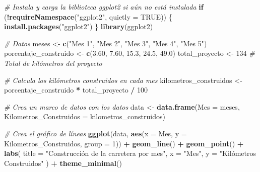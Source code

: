 \documentclass[
]{article}
\newenvironment{Shaded}{\begin{snugshade}}{\end{snugshade}}
\newcommand{\AttributeTok}[1]{\textcolor[rgb]{0.13,0.29,0.53}{#1}}
\newcommand{\CommentTok}[1]{\textcolor[rgb]{0.56,0.35,0.01}{\textit{#1}}}
\newcommand{\ConstantTok}[1]{\textcolor[rgb]{0.56,0.35,0.01}{#1}}
\newcommand{\ControlFlowTok}[1]{\textcolor[rgb]{0.13,0.29,0.53}{\textbf{#1}}}
\newcommand{\DecValTok}[1]{\textcolor[rgb]{0.00,0.00,0.81}{#1}}
\newcommand{\FloatTok}[1]{\textcolor[rgb]{0.00,0.00,0.81}{#1}}
\newcommand{\FunctionTok}[1]{\textcolor[rgb]{0.13,0.29,0.53}{\textbf{#1}}}
\newcommand{\NormalTok}[1]{#1}
\newcommand{\OtherTok}[1]{\textcolor[rgb]{0.56,0.35,0.01}{#1}}
\newcommand{\SpecialCharTok}[1]{\textcolor[rgb]{0.81,0.36,0.00}{\textbf{#1}}}
\newcommand{\StringTok}[1]{\textcolor[rgb]{0.31,0.60,0.02}{#1}}
\begin{document}
\begin{Shaded}
\begin{Highlighting}[]
\CommentTok{\# Instala y carga la biblioteca ggplot2 si aún no está instalada}
\ControlFlowTok{if}\NormalTok{ (}\SpecialCharTok{!}\FunctionTok{requireNamespace}\NormalTok{(}\StringTok{"ggplot2"}\NormalTok{, }\AttributeTok{quietly =} \ConstantTok{TRUE}\NormalTok{)) \{}
  \FunctionTok{install.packages}\NormalTok{(}\StringTok{"ggplot2"}\NormalTok{)}
\NormalTok{\}}
\FunctionTok{library}\NormalTok{(ggplot2)}

\CommentTok{\# Datos}
\NormalTok{meses }\OtherTok{\textless{}{-}} \FunctionTok{c}\NormalTok{(}\StringTok{"Mes 1"}\NormalTok{, }\StringTok{"Mes 2"}\NormalTok{, }\StringTok{"Mes 3"}\NormalTok{, }\StringTok{"Mes 4"}\NormalTok{, }\StringTok{"Mes 5"}\NormalTok{)}
\NormalTok{porcentaje\_construido }\OtherTok{\textless{}{-}} \FunctionTok{c}\NormalTok{(}\FloatTok{3.60}\NormalTok{, }\FloatTok{7.60}\NormalTok{, }\FloatTok{15.3}\NormalTok{, }\FloatTok{24.5}\NormalTok{, }\FloatTok{49.0}\NormalTok{)}
\NormalTok{total\_proyecto }\OtherTok{\textless{}{-}} \DecValTok{134}  \CommentTok{\# Total de kilómetros del proyecto}

\CommentTok{\# Calcula los kilómetros construidos en cada mes}
\NormalTok{kilometros\_construidos }\OtherTok{\textless{}{-}}\NormalTok{ porcentaje\_construido }\SpecialCharTok{*}\NormalTok{ total\_proyecto }\SpecialCharTok{/} \DecValTok{100}

\CommentTok{\# Crea un marco de datos con los datos}
\NormalTok{data }\OtherTok{\textless{}{-}} \FunctionTok{data.frame}\NormalTok{(}\AttributeTok{Mes =}\NormalTok{ meses, }\AttributeTok{Kilometros\_Construidos =}\NormalTok{ kilometros\_construidos)}

\CommentTok{\# Crea el gráfico de líneas}
\FunctionTok{ggplot}\NormalTok{(data, }\FunctionTok{aes}\NormalTok{(}\AttributeTok{x =}\NormalTok{ Mes, }\AttributeTok{y =}\NormalTok{ Kilometros\_Construidos, }\AttributeTok{group =} \DecValTok{1}\NormalTok{)) }\SpecialCharTok{+}
  \FunctionTok{geom\_line}\NormalTok{() }\SpecialCharTok{+}
  \FunctionTok{geom\_point}\NormalTok{() }\SpecialCharTok{+}
  \FunctionTok{labs}\NormalTok{(}
    \AttributeTok{title =} \StringTok{"Construcción de la carretera por mes"}\NormalTok{,}
    \AttributeTok{x =} \StringTok{"Mes"}\NormalTok{,}
    \AttributeTok{y =} \StringTok{"Kilómetros Construidos"}
\NormalTok{  ) }\SpecialCharTok{+}
  \FunctionTok{theme\_minimal}\NormalTok{()}
\end{Highlighting}
\end{Shaded}
\end{document}
